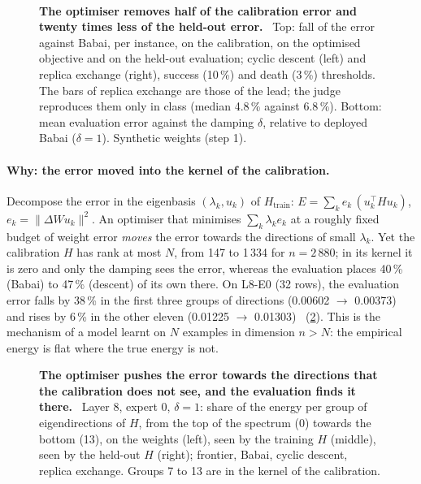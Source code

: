 \begin{figure}[tbp]
\centering
{}\\[4pt]
\caption[P5: gains per instance and damping]{\textbf{The optimiser removes half of the calibration error and twenty times less of the held-out error.} \mes~Top: fall of the error against Babai, per instance, on the calibration, on the optimised objective and on the held-out evaluation; cyclic descent (left) and replica exchange (right), success (10\,\%) and death (3\,\%) thresholds. The bars of replica exchange are those of the lead; the judge reproduces them only in class (median 4.8\,\% against 6.8\,\%). Bottom: mean evaluation error against the damping $\delta$, relative to deployed Babai ($\delta = 1$). Synthetic weights (step 1). \HorsStyle{}}
\label{fig:t3-mim-p5-gains}
\end{figure}

\paragraph{Why: the error moved into the kernel of the calibration.} Decompose the error in the eigenbasis $(\lambda_k, u_k)$ of $H_{\text{train}}$: $E = \sum_k e_k\,(u_k^\top H u_k)$, $e_k = \lVert \Delta W u_k \rVert^2$. An optimiser that minimises $\sum_k \lambda_k e_k$ at a roughly fixed budget of weight error \emph{moves} the error towards the directions of small $\lambda_k$. Yet the calibration $H$ has rank at most $N$, from 147 to 1\,334 for $n = 2\,880$; in its kernel it is zero and only the damping sees the error, whereas the evaluation places 40\,\% (Babai) to 47\,\% (descent) of its own there. On L8-E0 (32 rows), the evaluation error falls by 38\,\% in the first three groups of directions (0.00602 $\to$ 0.00373) and rises by 6\,\% in the other eleven (0.01225 $\to$ 0.01303) \mes~(\cref{fig:t3-mim-p5-spectre}). This is the mechanism of a model learnt on $N$ examples in dimension $n > N$: the empirical energy is flat where the true energy is not.

\begin{figure}[tbp]
\centering
{}
\caption[P5: where the error is moved]{\textbf{The optimiser pushes the error towards the directions that the calibration does not see, and the evaluation finds it there.} \mes~Layer 8, expert 0, $\delta = 1$: share of the energy per group of eigendirections of $H$, from the top of the spectrum (0) towards the bottom (13), on the weights (left), seen by the training $H$ (middle), seen by the held-out $H$ (right); frontier, Babai, cyclic descent, replica exchange. Groups 7 to 13 are in the kernel of the calibration. \HorsStyle{}}
\label{fig:t3-mim-p5-spectre}
\end{figure}

